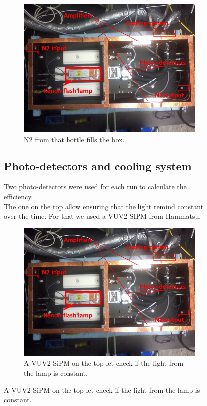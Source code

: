 \documentclass[a4paper, 11pt]{report}%
\begin{document}
\begin{figure}[!hbtp]
  \centering
  \begin{figure}[!hbtp]  
    \includegraphics[totalheight=.35\textwidth,trim=0cm 7cm 0cm 2.5cm, clip=true,]{../Pictures/blabla/box.jpg}
    \caption{N2 from that bottle fills the box.}
    \label{fig:filter_specification}
  \end{figure}
  
  
  \subsection{Photo-detectors and cooling system}
  
  Two photo-detectors were used for each run to calculate the efficiency.\\
  The one on the top allow ensuring that the light remind constant over the time. For that we used a VUV2 SIPM from Hammatsu.
  
  \centering
  \begin{figure}[!hbtp]  
    \includegraphics[totalheight=.35\textwidth,trim=0cm 7cm 0cm 2.5cm, clip=true,]{../Pictures/blabla/box.jpg}
    \caption{A VUV2 SiPM on the top let check if the  light from the lamp is constant.}
    \label{fig:top}
  \end{figure}
  

\end{figure}
\end{document}
